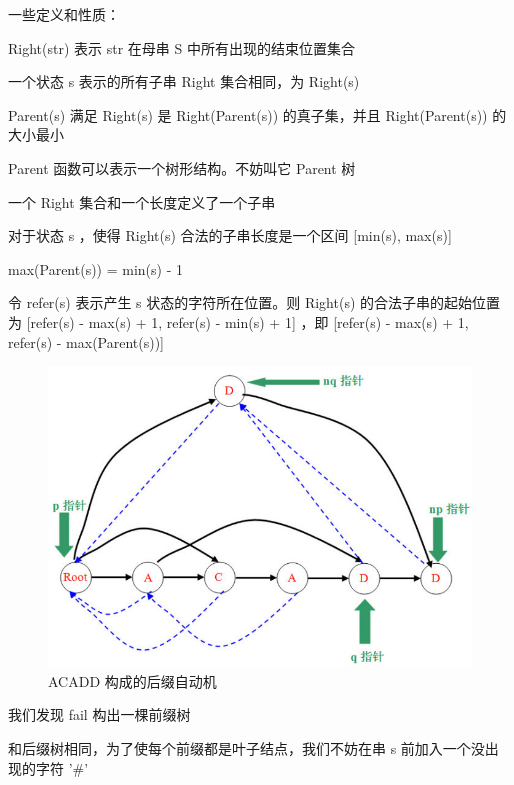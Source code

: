 \documentclass{article}
\begin{document}
一些定义和性质：

Right(str) 表示 str 在母串 S 中所有出现的结束位置集合

一个状态 s 表示的所有子串 Right 集合相同，为 Right(s)

Parent(s) 满足 Right(s) 是 Right(Parent(s)) 的真子集，并且 Right(Parent(s)) 的大小最小

Parent 函数可以表示一个树形结构。不妨叫它 Parent 树

一个 Right 集合和一个长度定义了一个子串

对于状态 s ，使得 Right(s) 合法的子串长度是一个区间 [min(s), max(s)]

max(Parent(s)) = min(s) - 1

令 refer(s) 表示产生 s 状态的字符所在位置。则 Right(s) 的合法子串的起始位置为 [refer(s) - max(s) + 1, refer(s) - min(s) + 1] ，即 [refer(s) - max(s) + 1, refer(s) - max(Parent(s))]

\begin{figure}[htbp]
  \centering
  \includegraphics[scale=0.6]{suffix_auto.jpg}
  \caption{ACADD 构成的后缀自动机}
  \label{suffix_auto}
\end{figure}

我们发现 fail 构出一棵前缀树

和后缀树相同，为了使每个前缀都是叶子结点，我们不妨在串 s 前加入一个没出现的字符 '\#'
\end{document}
